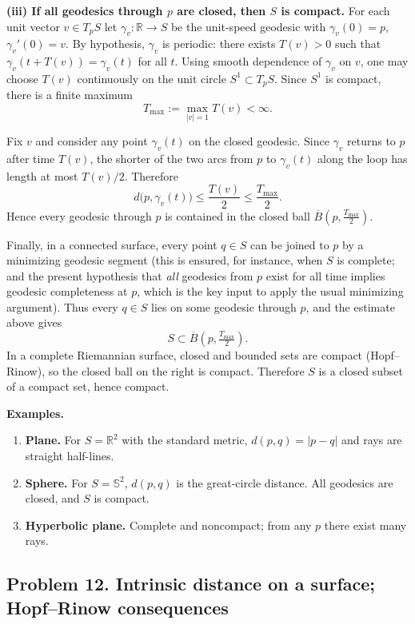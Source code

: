 \documentclass[12pt,a4paper]{article}
\theoremstyle{plain}
\theoremstyle{definition}      %
\begin{document}
	\smallskip
	\textbf{(iii) If all geodesics through $p$ are closed, then $S$ is compact.}
	For each unit vector $v\in T_pS$ let $\gamma_v:\mathbb R\to S$ be the unit-speed geodesic with $\gamma_v(0)=p$, $\gamma_v'(0)=v$.
	By hypothesis, $\gamma_v$ is periodic: there exists $T(v)>0$ such that $\gamma_v(t+T(v))=\gamma_v(t)$ for all $t$.
	Using smooth dependence of $\gamma_v$ on $v$, one may choose $T(v)$ continuously on the unit circle $S^1\subset T_pS$.
	Since $S^1$ is compact, there is a finite maximum
	\[
	T_{\max}:=\max_{|v|=1} T(v)<\infty.
	\]
	
	Fix $v$ and consider any point $\gamma_v(t)$ on the closed geodesic. Since $\gamma_v$ returns to $p$ after time $T(v)$,
	the shorter of the two arcs from $p$ to $\gamma_v(t)$ along the loop has length at most $T(v)/2$. Therefore
	\[
	d\bigl(p,\gamma_v(t)\bigr)\le \frac{T(v)}{2}\le \frac{T_{\max}}{2}.
	\]
	Hence every geodesic through $p$ is contained in the closed ball $\overline B\!\left(p,\tfrac{T_{\max}}{2}\right)$.
	
	Finally, in a connected surface, every point $q\in S$ can be joined to $p$ by a minimizing geodesic segment (this is ensured, for instance,
	when $S$ is complete; and the present hypothesis that \emph{all} geodesics from $p$ exist for all time implies geodesic completeness at $p$,
	which is the key input to apply the usual minimizing argument). Thus every $q\in S$ lies on some geodesic through $p$, and the estimate above gives
	\[
	S \subset \overline B\!\left(p,\tfrac{T_{\max}}{2}\right).
	\]
	In a complete Riemannian surface, closed and bounded sets are compact (Hopf--Rinow), so the closed ball on the right is compact.
	Therefore $S$ is a closed subset of a compact set, hence compact.
	
	\medskip
	\textbf{Examples.}
	\begin{enumerate}
		\item \textbf{Plane.} For $S=\mathbb R^2$ with the standard metric, $d(p,q)=|p-q|$ and rays are straight half-lines.
		\item \textbf{Sphere.} For $S=\mathbb S^2$, $d(p,q)$ is the great-circle distance. All geodesics are closed, and $S$ is compact.
		\item \textbf{Hyperbolic plane.} Complete and noncompact; from any $p$ there exist many rays.
	\end{enumerate}
	
	\subsection*{Problem 12. Intrinsic distance on a surface; Hopf--Rinow consequences}
	
\end{document}
